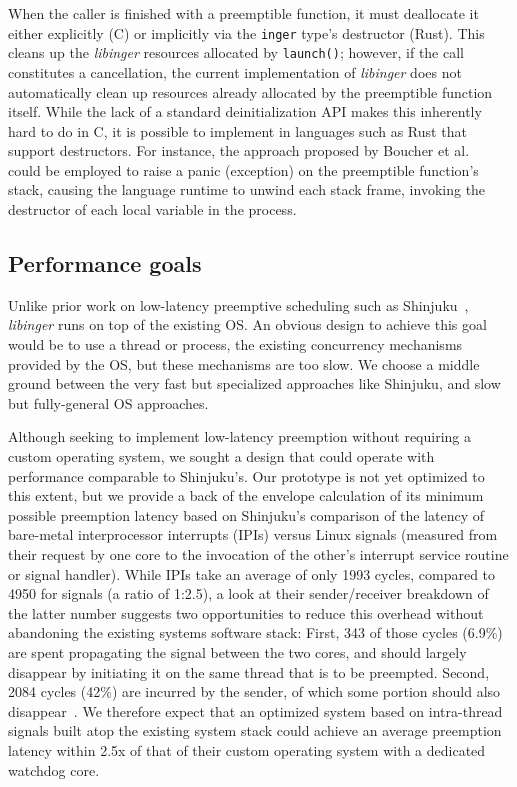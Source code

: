 When the caller is finished with a preemptible function, it must deallocate it
either explicitly (C) or implicitly via the \texttt{inger} type's destructor
(Rust).  This cleans up the \textit{libinger} resources allocated by
\texttt{launch()};
however, if the call constitutes a cancellation, the current implementation of
\textit{libinger} does not automatically clean up resources already allocated by the
preemptible function itself.  While the lack of a standard deinitialization API
makes this inherently hard to do in C, it is possible to implement in languages
such as Rust that support destructors.  For instance, the approach proposed by
Boucher et al.~\cite{boucher:atc2018} could be employed to raise a panic
(exception) on the preemptible function's stack, causing the language runtime
to unwind each stack frame, invoking the destructor of each local variable in
the process.


\subsection{Performance goals}

Unlike prior work on low-latency preemptive scheduling such as
Shinjuku~\cite{Kaffes:nsdi2019}, \textit{libinger} runs on top of the existing
OS. An obvious design to achieve this goal would be to use a thread or process,
the existing concurrency mechanisms provided by the OS, but these mechanisms
are too slow. We choose a middle ground between the very fast but specialized
approaches like Shinjuku, and slow but fully-general OS approaches.

Although seeking to implement low-latency preemption without requiring a custom
operating system, we sought a design that could operate with performance
comparable to Shinjuku's.  Our prototype is not yet optimized to this extent,
but we provide a back of the envelope calculation of its minimum possible
preemption latency based on Shinjuku's comparison of the latency of bare-metal
interprocessor interrupts (IPIs) versus Linux signals (measured from their
request by one core to the invocation of the other's interrupt service routine
or signal handler).  While IPIs take an average of only 1993 cycles, compared
to 4950 for signals (a ratio of 1:2.5), a look at their sender/receiver
breakdown of the latter number suggests two opportunities to reduce this
overhead without abandoning the existing systems software stack:  First, 343 of
those cycles (6.9\%) are spent propagating the signal between the two cores,
and should largely disappear by initiating it on the same thread that is to be
preempted.  Second, 2084 cycles (42\%) are incurred by the sender, of which
some portion should also disappear~\cite{Kaffes:nsdi2019}.  We therefore expect
that an optimized system based on intra-thread signals built atop the existing
system stack could achieve an average preemption latency within 2.5x of that of
their custom operating system with a dedicated watchdog core.
